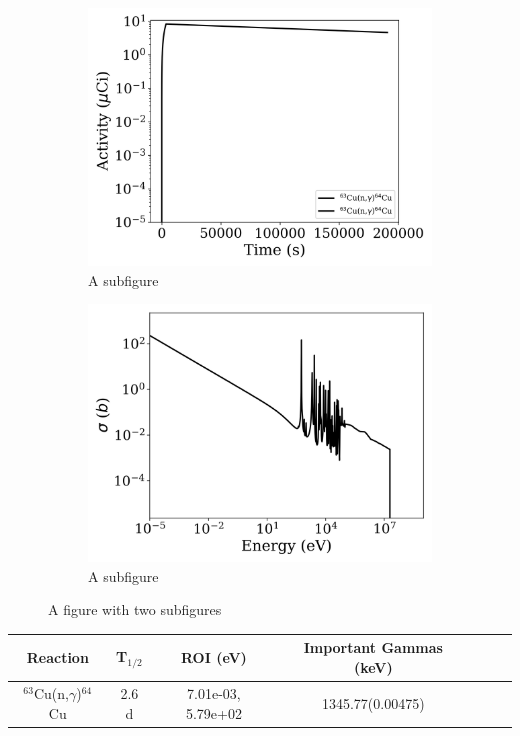 \begin{figure}[h]
\centering
\begin{subfigure}{.5\textwidth}
  \centering
     \includegraphics[width=.8\textwidth]{plot/Cu-63(n,gamma)Cu-64_wisconsin1} 

  \caption{A subfigure}
  \label{fig:sub1}
\end{subfigure}%
\begin{subfigure}{.5\textwidth}
  \centering
     \includegraphics[width=.8\textwidth]{plot/Cu-63(n,gamma)Cu-64} 

  \caption{A subfigure}
  \label{fig:sub2}
\end{subfigure}
\caption{A figure with two subfigures}
\label{fig:test}
\end{figure}

\begin{table}[h]
\centering
\begin{tabular}{ |c|c|c|c|c|c|c| }
 \hline
 Reaction & T$_{1/2}$ & ROI (eV) & Important Gammas (keV) \\
 \hline 
 $^{63}$Cu(n,$\gamma$)$^{64}$Cu &  2.6 d & 7.01e-03, 5.79e+02 & 1345.77(0.00475) \\ 
\hline
\end{tabular}
\end{table}
